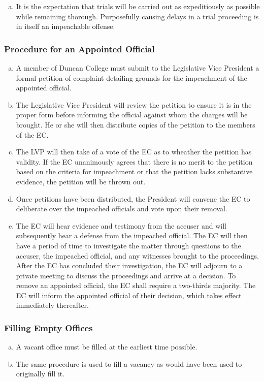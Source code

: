 \documentclass[USletter,12pt]{article}
\begin{document}
\begin{enumerate}[(a)]
\begin{enumerate}[(a)]
\item It is the expectation that trials will be carried out as expeditiously as possible while remaining thorough.  Purposefully causing delays in a trial proceeding is in itself an impeachable offense.
\end{enumerate}

\subsubsection{Procedure for an Appointed Official}
\begin{enumerate}[(a)]
\item A member of Duncan College must submit to the Legislative Vice President a formal petition of complaint detailing grounds for the impeachment of the appointed official.
\item The Legislative Vice President will review the petition to ensure it is in the proper form before informing the official against whom the charges will be brought.  He or she will then distribute copies of the petition to the members of the EC.
\item The LVP will then take of a vote of the EC as to wheather the petition has validity.  If the EC unanimously agrees that there is no merit to the petition based on the criteria for impeachment or that the petition lacks substantive evidence, the petition will be thrown out.
\item Once petitions have been distributed, the President will convene the EC to deliberate over the impeached officials and vote upon their removal.
\item The EC will hear evidence and testimony from the accuser and will subsequently hear a defense from the impeached official.  The EC will then have a period of time to investigate the matter through questions to the accuser, the impeached official, and any witnesses brought to the proceedings.  After the EC has concluded their investigation, the EC will adjourn to a private meeting to discuss the proceedings and arrive at a decision. To remove an appointed official, the EC shall require a two-thirds majority.  The EC will inform the appointed official of their decision, which takes effect immediately thereafter.
\end{enumerate}

\subsubsection{Filling Empty Offices}
\begin{enumerate}[(a)]
\item A vacant office must be filled at the earliest time possible.
\item The same procedure is used to fill a vacancy as would have been used to originally fill it.
\end{enumerate}



\end{enumerate}
\end{document}
